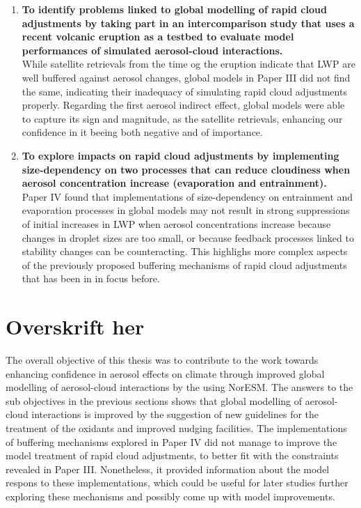 \begin{enumerate}
	\item \textbf{To identify problems linked to global modelling of rapid cloud adjustments by taking part in an intercomparison study that uses a recent volcanic eruption as a testbed to evaluate model performances of simulated aerosol-cloud interactions.}\\
	    While satellite retrievals from the time og the eruption indicate that LWP are well buffered against aerosol changes, global models in Paper III did not find the same, indicating their inadequacy of simulating rapid cloud adjustments properly. Regarding the first aerosol indirect effect, global models were able to capture its sign and magnitude, as the satellite retrievals, enhancing our confidence in it beeing both negative and of importance. 
	\item \textbf{To explore impacts on rapid cloud adjustments by implementing size-dependency on two processes that can reduce cloudiness when aerosol concentration increase (evaporation and entrainment).}\\
	    Paper IV found that implementations of size-dependency on entrainment and evaporation processes in global models may not result in strong suppressions of initial increases in LWP when aerosol concentrations increase because changes in droplet sizes are too small, or because feedback processes linked to stability changes can be counteracting. This highlighs more complex aspects of the previously proposed buffering mechanisms of rapid cloud adjustments that has been in in focus before.   
\end{enumerate}

\section{Overskrift her}
The overall objective of this thesis was to contribute to the work towards enhancing confidence in aerosol effects on climate through improved global modelling of aerosol-cloud interactions by the using NorESM. The answers to the sub objectives in the previous sections shows that global modelling of aerosol-cloud interactions is improved by the suggestion of new guidelines for the treatment of the oxidants and improved nudging facilities. The implementations of buffering mechanisms explored in Paper IV did not manage to improve the model treatment of rapid cloud adjustments, to better fit with the constraints revealed in Paper III. Nonetheless, it provided information about the model respons to these implementations, which could be useful for later studies further exploring these mechanisms and possibly come up with model improvements. 





\color{black}